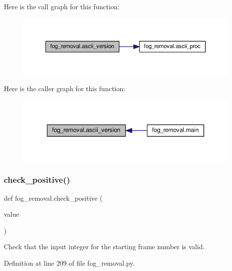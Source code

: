 Here is the call graph for this function\+:\nopagebreak
\begin{figure}[H]
\begin{center}
\leavevmode
\includegraphics[width=350pt]{namespacefog__removal_a6e25df53e59d9d8848b5e2ed5a399ea3_cgraph}
\end{center}
\end{figure}
Here is the caller graph for this function\+:\nopagebreak
\begin{figure}[H]
\begin{center}
\leavevmode
\includegraphics[width=340pt]{namespacefog__removal_a6e25df53e59d9d8848b5e2ed5a399ea3_icgraph}
\end{center}
\end{figure}
\mbox{\label{namespacefog__removal_a7ea01fc3bbbb26aa0f4d20724849308c}} 
\subsubsection{\texorpdfstring{check\+\_\+positive()}{check\_positive()}}
{\footnotesize\ttfamily def fog\+\_\+removal.\+check\+\_\+positive (\begin{DoxyParamCaption}\item[{}]{value }\end{DoxyParamCaption})}



Check that the input integer for the starting frame number is valid. 



Definition at line 209 of file fog\+\_\+removal.\+py.

